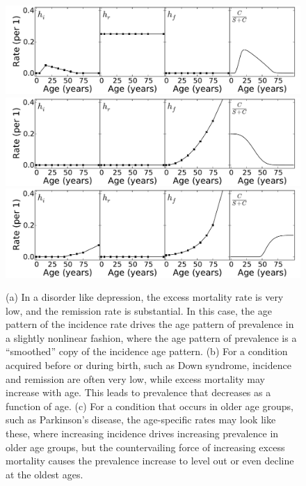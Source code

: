 \begin{figure}
\begin{center}
\includegraphics[width=\textwidth]{forward-sim-mental.pdf}
\includegraphics[width=\textwidth]{forward-sim-congenital.pdf}
\includegraphics[width=\textwidth]{forward-sim-old_age.pdf}
\caption[Examples of different diseases and their age-specific rates.]{ (a) 
  In a disorder like depression, the excess mortality rate is
  very low, and the remission rate is substantial.  In this case, the
  age pattern of the incidence rate drives the age pattern of
  prevalence in a slightly nonlinear fashion, where the age pattern
  of prevalence is a ``smoothed'' copy of the incidence age pattern.
(b) For a condition acquired before or during birth, such as
  Down syndrome, incidence and remission are often very low, while
  excess mortality may increase with age.  This leads to prevalence
  that decreases as a function of age.
(c) For a condition that occurs in older age groups, such as
  Parkinson's disease, the age-specific rates may look like these,
  where increasing incidence drives increasing prevalence in older
  age groups, but the countervailing force of increasing excess mortality
  causes the prevalence increase to level out or even decline at the
  oldest ages.
}
\label{forward-sim-ex3}
\end{center}
\end{figure}

